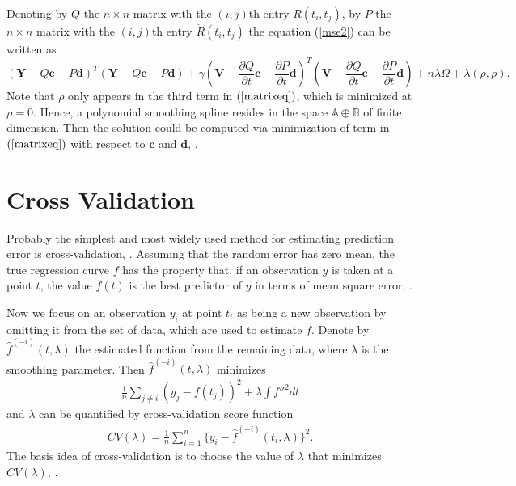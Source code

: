 Denoting by $Q$ the $n \times n$ matrix with the $(i,j)$th entry $R(t_i,t_j)$, by $P$ the $n \times n$ matrix with the $(i,j)$th entry $\dot{R}(t_i,t_j)$ the equation (\ref{mse2}) can be written as
\begin{equation}\label{matrixeq}
(\mathbf{Y}-Q\mathbf{c}-P\mathbf{d})^T(\mathbf{Y}-Q\mathbf{c}-P\mathbf{d})+\gamma (\mathbf{V}-\frac{\partial Q}{\partial t}\mathbf{c}-\frac{\partial P}{\partial t}\mathbf{d})^T(\mathbf{V}-\frac{\partial Q}{\partial t}\mathbf{c}-\frac{\partial P}{\partial t}\mathbf{d})+n\lambda \Omega+\lambda(\rho,\rho).
\end{equation}
Note that $\rho$ only appears in the third term in $(\ref{matrixeq})$, which is minimized at $\rho=0$. Hence, a polynomial smoothing spline resides in the space $\mathbb{A} \oplus \mathbb{B}$ of finite dimension. Then the solution could be computed via minimization of term in $(\ref{matrixeq})$ with respect to $\mathbf{c}$ and $\mathbf{d}$, \cite{gubook}.

\section{Cross Validation}

Probably the simplest and most widely used method for estimating prediction error is cross-validation, \cite{esl2009}. Assuming that the random error has zero mean, the true regression curve $f$ has the property that, if an observation $y$ is taken at a point $t$, the value $f(t)$ is the best predictor of $y$ in terms of mean square error, \cite{green1993nonparametric}. 

Now we focus on an observation $y_i$ at point $t_i$ as being a new observation by omitting it from the set of data, which are used to estimate $\hat{f}$. Denote by $\hat{f}^{(-i)}(t,\lambda)$ the estimated function from the remaining data, where $\lambda$ is the smoothing parameter. Then $\hat{f}^{(-i)}(t,\lambda)$ minimizes 
\begin{align*}
\frac{1}{n}\sum_{j \neq i}(y_j-f(t_j))^2+\lambda \int f''^2dt
\end{align*}
 and $\lambda$ can be quantified by cross-validation score function
\begin{align*}
CV(\lambda)=\frac{1}{n}\sum_{i=1}^{n}\{y_i-\hat{f}^{(-i)}(t_i,\lambda)\}^2.
\end{align*}
The basis idea of cross-validation is to choose the value of $\lambda$ that minimizes $CV(\lambda)$, \cite{green1993nonparametric}.

